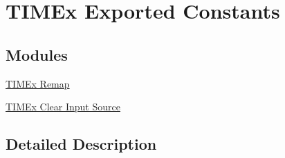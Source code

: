 \hypertarget{group___t_i_m_ex___exported___constants}{}\section{T\+I\+M\+Ex Exported Constants}
\label{group___t_i_m_ex___exported___constants}
\subsection*{Modules}
\begin{DoxyCompactItemize}
\item 
\hyperlink{group___t_i_m_ex___remap}{T\+I\+M\+Ex Remap}
\item 
\hyperlink{group___t_i_m_ex___clock___clear___input___source}{T\+I\+M\+Ex Clear Input Source}
\end{DoxyCompactItemize}


\subsection{Detailed Description}
